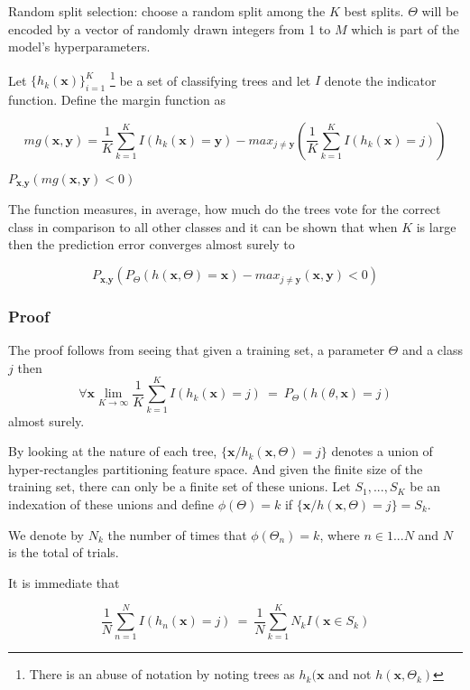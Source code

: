 Random split selection: choose a random split among the $K$ best splits. $\Theta$ will be encoded by a vector of randomly drawn integers from 1 to $M$ which is part of the model's hyperparameters.

Let $\{h_k(\textbf{x})\}_{i=1}^K$  \footnote{There is an abuse of notation by noting trees as $h_k(\textbf{x}$ and not $h(\textbf{x}, \Theta_k)$ } be a set of classifying trees and let $I$ denote the indicator function.  Define the margin function as

$$mg(\textbf{x},\textbf{y}) =  \frac{1}{K}   \sum_{k=1}^K I(h_k(\textbf{x}) = \textbf{y})  
- max_{j\neq \textbf{y}}\left(\frac{1}{K} \sum_{k=1}^K I(h_k(\textbf{x}) = j) \right) $$ \label{eq:rf-marginFun}

$ P_{\textbf{x}, \textbf{y} }(mg(\textbf{x}, \textbf{y}) < 0) $


The function measures, in average, how much do the trees vote for the correct class in comparison to all other classes and it can be shown that when $K$ is large then the prediction error converges almost surely to 

$$ P_{\textbf{x}, \textbf{y} } ( P_{\Theta} (h(\textbf{x}, \Theta) = \textbf{x}) - max_{j \neq \textbf{y}} (\textbf{x}, \textbf{y}) < 0) $$

\subsubsection{Proof}
The proof follows from seeing that given a training set, a parameter $\Theta$ and a class $j$ then 
$$\forall \textbf{x} \lim_{K\to\infty} \frac{1}{K} \sum_{k=1}^K I(h_k(\textbf{x}) = j) \ =   \ P_\Theta(h(\theta,\textbf{x}) = j) $$
 almost surely.

By looking at the nature of each tree, $\{\textbf{x} / h_k(\textbf{x}, \Theta) = j \}$ denotes a union of hyper-rectangles partitioning feature space. And given the finite size of the training set, there can only be a finite set of these unions. Let $S_1, ..., S_K$ be an indexation of these unions and define $\phi(\Theta) = k $ if $\{\textbf{x} / h(\textbf{x}, \Theta) = j \} = S_k$. 

We denote by $N_k$ the number of times that $\phi(\Theta_n) =k $, where $n \in {1...N}$ and $N$ is the total of trials.

It is immediate that 

$$ \frac{1}{N} \sum_{n=1}^N I(h_n(\textbf{x}) = j) \ = \  \frac{1}{N} \sum_{k=1}^K N_k I(\textbf{x} \in S_k)  $$

